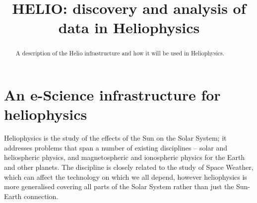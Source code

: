 \documentclass[conference]{IEEEtran}
\begin{document}
\title{HELIO: discovery and analysis of data in Heliophysics}



\author{
\and
{}
}
% 
\maketitle
\begin{abstract}
A description of the Helio infrastructure and how it will be used in Heliophysics.
\end{abstract}
%
\IEEEpeerreviewmaketitle
\section{An e-Science infrastructure for heliophysics}
Heliophysics is the study of the effects of the Sun on the Solar
System; it addresses problems that span a number of existing
disciplines – solar and heliospheric physics, and magnetospheric and
ionospheric physics for the Earth and other planets. The discipline is
closely related to the study of Space Weather, which can affect the
technology on which we all depend, however heliophysics is more
generalised covering all parts of the Solar System rather than just
the Sun-Earth connection.
\end{document}
